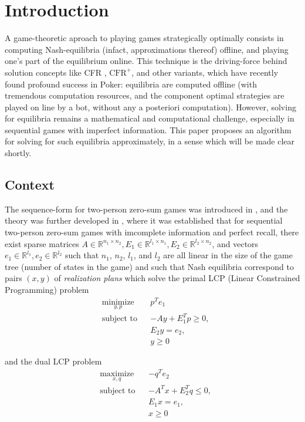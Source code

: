 \documentclass[12pt]{article}
\begin{document}
\section{Introduction}
\label{sec:intro}
A game-theoretic aproach to playing games strategically optimally consists in computing Nash-equilibria (infact, approximations thereof) offline, and playing one's part of the equilibrium online. This technique is the driving-force behind solution concepts like CFR \cite{lanctot2009monte}, $\text{CFR}^{+}$, and other variants, which have recently found profound success in Poker: equilibria are computed offline (with tremendous computation resources, and the component optimal strategies are played on line by a bot, without any a posteriori computation). However, solving for equilibria remains a mathematical and computational challenge, especially in sequential games with imperfect information. This paper proposes an algorithm for solving for such equilibria approximately, in a sense which will be made clear shortly.

\subsection{Context}
The sequence-form for two-person zero-sum games was introduced in \cite{koller1992complexity}, and the theory was further developed in \cite{von1996efficient, vonequilibrium}, where it was established that for sequential two-person zero-sum games with imcomplete information and perfect recall, there exist sparse matrices $A \in \mathbb{R}^{n_1 \times n_2}, E_1 \in \mathbb{R}^{l_1 \times n_1}, E_2 \in \mathbb{R}^{l_2 \times n_2}$, and vectors $e_1 \in \mathbb{R}^{l_1}, e_2 \in \mathbb{R}^{l_2}$ such that $n_1$, $n_2$, $l_1$, and $l_2$ are all linear in the size of the game tree (number of states in the game) and such that Nash equilibria correspond to pairs $(x, y)$ of \textit{realization plans} which solve the primal LCP (Linear Constrained Programming) problem
\begin{equation}
  \begin{aligned}
    & \underset{y,p}{\text{minimize}}
    & & p^Te_1 \\
    & \text{subject to}
    & & -Ay + E_1^Tp \geq 0,\\
    &&& E_2y = e_2,\\
    &&& y \ge 0
  \end{aligned}
  \label{eq:primal_pb}
\end{equation}

and the dual LCP problem
\begin{equation}
  \begin{aligned}
    & \underset{x,q}{\text{maximize}}
    & & -q^Te_2 \\
    & \text{subject to}
    & & -A^Tx + E_2^Tq \leq 0,\\
    &&& E_1x = e_1,\\
    &&& x \ge 0
  \end{aligned}
  \label{eq:dual_pb}
\end{equation}
\end{document}

